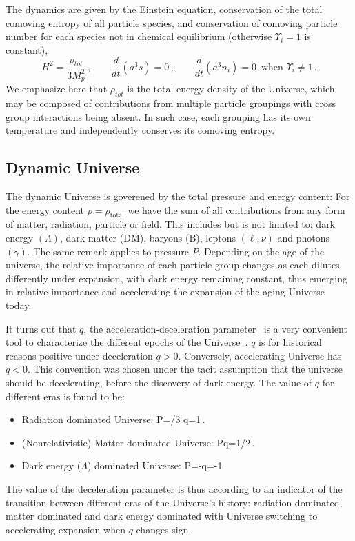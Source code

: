 The dynamics are given by the Einstein equation, conservation of the total comoving entropy of all particle species, and conservation of comoving particle number for each species not in chemical equilibrium (otherwise $\Upsilon_i=1$ is constant),
\begin{equation}\label{eq_dynamics}
H^2=\frac{\rho_{tot}}{3M_p^2}\,, \qquad \frac{d}{dt}(a^3s)=0\,,\qquad \frac{d}{dt}(a^3n_i)=0 \,\text{ when } \Upsilon_i\neq 1\,.
\end{equation}
We emphasize here that $\rho_{tot}$ is the total energy density of the Universe, which may be composed of contributions from multiple particle groupings with cross group interactions being absent. In such case, each grouping has its own temperature and independently conserves its comoving entropy. 
%

\subsection{Dynamic Universe}\label{sec:dynamic}
The dynamic Universe is goverened by the total pressure and energy content: For the energy content $\rho=\rho_\mathrm{total}$ we have the sum of all contributions from any form of matter, radiation, particle or field. This includes but is not limited to: dark energy $(\Lambda)$, dark matter (DM), baryons (B), leptons $(\ell,\nu)$ and photons $(\gamma)$. The same remark applies to pressure $P$. Depending on the age of the universe, the relative importance of each particle group changes as each dilutes differently under expansion, with dark energy remaining constant, thus emerging in relative importance and accelerating the expansion of the aging Universe today. 

It turns out that $q$, the acceleration-deceleration parameter~ is a very convenient tool to characterize the different epochs of the Universe~\cite{Rafelski:2013yka}. $q$ is for historical reasons positive under deceleration $q>0$. Conversely, accelerating Universe has $q<0$. This convention was chosen under the tacit assumption that the universe should be decelerating, before the discovery of dark energy. The value of $q$ for different eras is found to be:
\begin{itemize}
\item Radiation dominated Universe: 
P=\rho/3 \implies q=1\,.
\eeqn
\item (Nonrelativistic) Matter dominated Universe: 
P\ll\rho \implies q=1/2\,.
\eeqn
\item Dark energy ($\Lambda$) dominated Universe: 
P=-\rho \implies q=-1\,.
\eeqn
\end{itemize}
The value of the deceleration parameter is thus according to  an indicator of the transition between different eras of the Universe's history: radiation dominated, matter dominated and dark energy dominated with Universe switching to accelerating expansion when $q$ changes sign.

